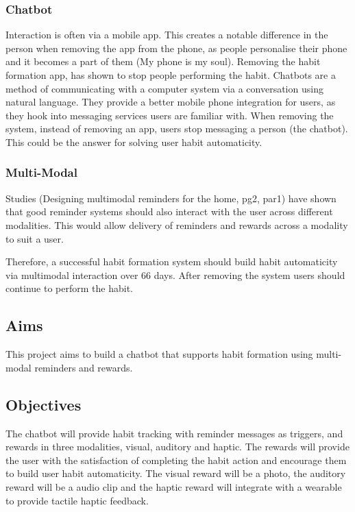\subsubsection*{Chatbot}
Interaction is often via a mobile app. This creates a notable difference in the person when removing the app from the phone, as people personalise their phone and it becomes a part of them (My phone is my soul). Removing the habit formation app, has shown to stop people performing the habit. Chatbots are a method of communicating with a computer system via a conversation using natural language. They provide a better mobile phone integration for users, as they hook into messaging services users are familiar with. When removing the system, instead of removing an app, users stop messaging a person (the chatbot). This could be the answer for solving user habit automaticity.

\subsubsection*{Multi-Modal}
Studies (Designing multimodal reminders for the home, pg2, par1) have shown that good reminder systems should also interact with the user across different modalities. This would allow delivery of reminders and rewards across a modality to suit a user.

Therefore, a successful habit formation system should build habit automaticity via multimodal interaction over 66 days. After removing the system users should continue to perform the habit.

\subsection*{Aims}
This project aims to build a chatbot that supports habit formation using multi-modal reminders and rewards.

\subsection*{Objectives}
The chatbot will provide habit tracking with reminder messages as triggers, and rewards in three modalities, visual, auditory and haptic.\newline
\newline
The rewards will provide the user with the satisfaction of completing the habit action and encourage them to build user habit automaticity. The visual reward will be a photo, the auditory reward will be a audio clip and the haptic reward will integrate with a wearable to provide tactile haptic feedback.

